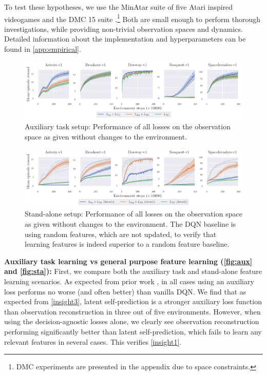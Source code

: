 To test these hypotheses, we use the MinAtar suite of five Atari inspired videogames \parencite{young19minatar} and the DMC 15 suite  \parencite{tunyasuvunakool2020}.\footnote{DMC experiments are presented in the appendix due to space constraints.}
Both are small enough to perform thorough investigations, while providing non-trivial observation spaces and dynamics.
Detailed information about the implementation and hyperparameters can be found in \autoref{app:empirical}.


\begin{figure}[b]
    \centering
    \includegraphics[width=\textwidth]{figures/understanding/rlc2024_minatar.pdf}
    \caption{Auxiliary task setup: Performance of all losses on the observation space as given without changes to the environment.}
    \label{fig:aux}
\end{figure}

\begin{figure}[t]
    \centering
    \includegraphics[width=\textwidth]{figures/understanding/rlc2024-detach_minatar.pdf}
    \caption{Stand-alone setup: Performance of all losses on the observation space as given without changes to the environment. The DQN baseline is using random features, which are not updated, to verify that learning features is indeed superior to a random feature baseline.}
    \label{fig:sta}
\end{figure}

\textbf{Auxiliary task learning vs general purpose feature learning (\autoref{fig:aux} and \autoref{fig:sta}):}
First, we compare both the auxiliary task and stand-alone feature learning scenarios.
As expected from prior work \parencite{jaderberg2016reinforcement,schwarzer2021dataefficient,farebrother2023protovalue}, in all cases using an auxiliary loss performs no worse (and often better) than vanilla DQN.
We find that as expected from \autoref{insight3}, latent self-prediction is a stronger auxiliary loss function than observation reconstruction in three out of five environments.
However, when using the decision-agnostic losses alone, we clearly see observation reconstruction performing significantly better than latent self-prediction, which fails to learn any relevant features in several cases. This verifies \autoref{insight1}.

